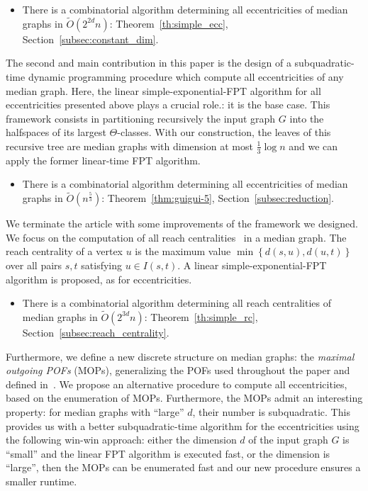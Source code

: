 \documentclass{article}
\newcommand{\set}[1]{\left\{ #1 \right\}}
\begin{document}
\begin{itemize}
\item There is a combinatorial algorithm determining all eccentricities of median graphs in $\tilde{O}(2^{2d}n)$: Theorem~\ref{th:simple_ecc}, Section~\ref{subsec:constant_dim}.
\end{itemize}

The second and main contribution in this paper is the design of a subquadratic-time dynamic programming procedure which compute all eccentricities of any median graph. Here, the linear simple-exponential-FPT algorithm for all eccentricities presented above plays a crucial role.: it is the base case. This framework consists in partitioning recursively the input graph $G$ into the halfspaces of its largest $\Theta$-classes. With our construction, the leaves of this recursive tree are median graphs with dimension at most $\frac{1}{3}\log n$ and we can apply the former linear-time FPT algorithm.

\begin{itemize}
    \item There is a combinatorial algorithm determining all eccentricities of median graphs in $\tilde{O}(n^{\frac{5}{3}})$: Theorem~\ref{thm:guigui-5}, Section~\ref{subsec:reduction}.
\end{itemize}

We terminate the article with some improvements of the framework we designed. We focus on the computation of all reach centralities~\cite{Gu04} in a median graph. The reach centrality of a vertex $u$ is the maximum value $\min \set{d(s,u),d(u,t)}$ over all pairs $s,t$ satisfying $u \in I(s,t)$. A linear simple-exponential-FPT algorithm is proposed, as for eccentricities.

\begin{itemize}
    \item There is a combinatorial algorithm determining all reach centralities of median graphs in $\tilde{O}(2^{3d}n)$: Theorem~\ref{th:simple_rc}, Section~\ref{subsec:reach_centrality}.
\end{itemize}

Furthermore, we define a new discrete structure on median graphs: the \textit{maximal outgoing POFs} (MOPs), generalizing the POFs used throughout the paper and defined in~\cite{BeHa21}. We propose an alternative procedure to compute all eccentricities, based on the enumeration of MOPs. Furthermore, the MOPs admit an interesting property: for median graphs with ``large'' $d$, their number is subquadratic. This provides us with a better subquadratic-time algorithm for the eccentricities using the following win-win approach: either the dimension $d$ of the input graph $G$ is ``small'' and the linear FPT algorithm is executed fast, or the dimension is ``large'', then the MOPs can be enumerated fast and our new procedure ensures a smaller runtime.
\end{document}
